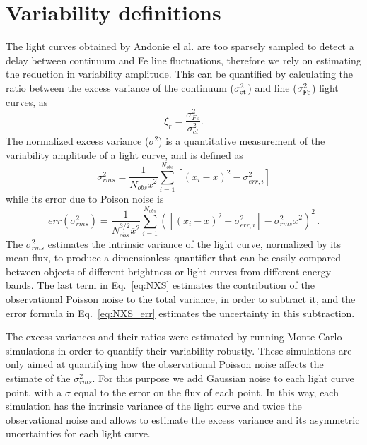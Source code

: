 \section{Variability definitions} \label{sec:variability_defs}
The light curves obtained by Andonie el al. are too sparsely sampled to detect a delay between continuum and Fe line fluctuations, therefore we rely on estimating the reduction in variability amplitude. This can be quantified by calculating the ratio between the excess variance of the continuum ($\sigma^2_{\rm ct}$) and \kalfa{} line ($\sigma^2_{\rm Fe}$) light curves, as %
\begin{equation}\label{eq:xi}
    \xi_{r}=\frac{\sigma^2_{Fe}}{\sigma^2_{ct}}.
\end{equation}\label{eq:xi}
The normalized excess variance ($\sigma^2$) \citep[e.g.,][]{1997ApJ...476...70N,2004ApJ...611...93P,2008A&A...487..475P} is a quantitative measurement of the variability amplitude of a light curve, and is defined as
\begin{equation}
\label{eq:NXS}
    \sigma^2_{rms} = \frac{1}{N_{obs}\overline{x}^2} \sum^{N_{obs}}_{i=1} [(x_i-\overline{x})^2-\sigma^2_{err,i}]
\end{equation}
while its error due to Poison noise is
\begin{equation}
\label{eq:NXS_err}
 err( \sigma^2_{rms}) = \frac{1}{N_{obs}^{3/2}\overline{x}^2} \sum^{N_{obs}}_{i=1} ([(x_i-\overline{x})^2-\sigma^2_{err,i}]-\sigma^2_{rms} \overline{x}^2)^2\,.
\end{equation}
The $\sigma^2_{rms}$ estimates the intrinsic variance of the light curve, normalized by its mean flux, to produce a dimensionless quantifier that can be easily compared between objects of different brightness or light curves from  different energy bands. The last term in Eq.~\ref{eq:NXS} estimates the contribution of the observational Poisson noise to the total variance, in order to subtract it, and the error formula in Eq.~\ref{eq:NXS_err} estimates the uncertainty in this subtraction. 

The excess variances and their ratios were estimated by running Monte Carlo simulations in order to quantify their variability robustly. 
These simulations are only aimed at quantifying how the observational Poisson noise affects the estimate of the $\sigma^2_{rms}$. For this purpose we add Gaussian noise to each light curve point, with a $\sigma$ equal to the error on the flux of each point. In this way, each simulation has the intrinsic variance of the light curve and twice the observational noise and allows to estimate the excess variance and its asymmetric uncertainties for each light curve.

